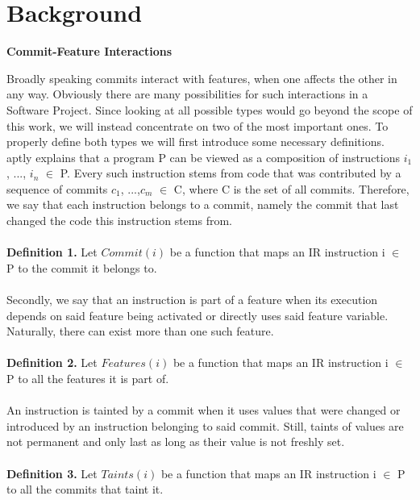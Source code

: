 \section*{Background}\label{ch:background}

\textbf{Commit-Feature Interactions}

Broadly speaking commits interact with features, when one affects the other in any way.
Obviously there are many possibilities for such interactions in a Software Project.
Since looking at all possible types would go beyond the scope of this work, we will instead concentrate on two of the most important ones.
To properly define both types we will first introduce some necessary definitions. \\
\citet{sattler2023seal} aptly explains that a program P can be viewed as a composition of instructions $i_1$, ..., $i_n$ $\in$ P.
Every such instruction stems from code that was contributed by a sequence of commits $c_1$, ...,$c_m$ $\in$ C, where C is the set of all commits.
Therefore, we say that each instruction belongs to a commit, namely the commit that last changed the code this instruction stems from. \\ \\
\textbf{Definition 1.} Let $Commit(i)$ be a function that maps an IR instruction i $\in$ P to the commit it belongs to. \\ \\
Secondly, we say that an instruction is part of a feature when its execution depends on said feature being activated or directly uses said feature variable. 
Naturally, there can exist more than one such feature. \\ \\
\textbf{Definition 2.} Let $Features(i)$ be a function that maps an IR instruction i $\in$ P to all the features it is part of. \\ \\
An instruction is tainted by a commit when it uses values that were changed or introduced by an instruction belonging to said commit. 
Still, taints of values are not permanent and only last as long as their value is not freshly set. \\ \\
\textbf{Definition 3.} Let $Taints(i)$ be a function that maps an IR instruction i $\in$ P to all the commits that taint it. \\ \\ \\

